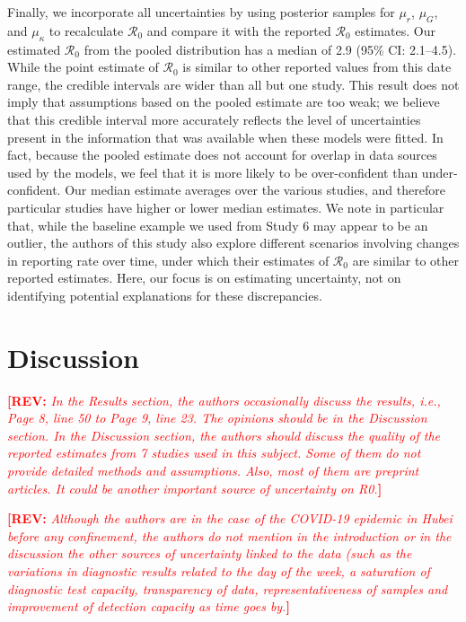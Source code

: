 \documentclass[12pt]{article}
\newcommand{\Ro}{\ensuremath{{\mathcal R}_{0}}\xspace}
\newcommand{\comment}[3]{\textcolor{#1}{\textbf{[#2: }\textsl{#3}\textbf{]}}}
\newcommand{\rev}[1]{\comment{red}{REV}{#1}}
\begin{document}
Finally, we incorporate all uncertainties by using posterior samples for $\mu_r$, $\mu_G$, and $\mu_\kappa$ to recalculate \Ro and compare it with the reported \Ro estimates.
Our estimated \Ro from the pooled distribution has a median of 2.9 (95\% CI: 2.1--4.5).
While the point estimate of \Ro is similar to other reported values from this date range, the credible intervals are wider than all but one study.
This result does not imply that assumptions based on the pooled estimate are too weak;
we believe that this credible interval more accurately reflects the level of uncertainties present in the information that was available when these models were fitted.
In fact, because the pooled estimate does not account for overlap in data sources used by the models, we feel that it is more likely to be over-confident than under-confident.
Our median estimate averages over the various studies, and therefore particular studies have higher or lower median estimates.
We note in particular that, while the baseline example we used from Study 6 may appear to be an outlier, the authors of this study also explore different scenarios involving changes in reporting rate over time, under which their estimates of \Ro are similar to other reported estimates.
Here, our focus is on estimating uncertainty, not on identifying potential explanations for these discrepancies.

\section{Discussion}

\rev{In the Results section, the authors occasionally discuss the results, i.e., Page 8, line 50 to Page
9, line 23. The opinions should be in the Discussion section.
In the Discussion section, the authors should discuss the quality of the reported estimates from
7 studies used in this subject. Some of them do not provide detailed methods and assumptions.
Also, most of them are preprint articles. It could be another important source of uncertainty on
R0.}

\rev{Although the authors are in the case of the COVID-19 epidemic in Hubei before any
confinement, the authors do not mention in the introduction or in the discussion the other
sources of uncertainty linked to the data (such as the variations in diagnostic results related to
the day of the week, a saturation of diagnostic test capacity, transparency of data,
representativeness of samples and improvement of detection capacity as time goes by.}
\end{document}
